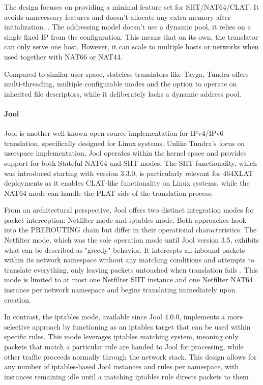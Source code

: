 The design focuses on providing a minimal feature set for SIIT/NAT64/CLAT. It avoids unnecessary features and doesn’t allocate any extra memory after initialization. \cite{labuda_tundra_nat64}. The addressing model doesn’t use a dynamic pool, it relies on a single fixed IP from the configuration. This means that on its own, the translator can only serve one host. However, it can scale to multiple hosts or networks when used together with NAT66 or NAT44\cite{labuda_tundra_nat64}.

Compared to similar user-space, stateless translators like Tayga, Tundra offers multi-threading, multiple configurable modes and the option to operate on inherited file descriptors, while it deliberately lacks a dynamic address pool\cite{labuda_tundra_nat64}. 

\paragraph{Jool} 


Jool is another well-known open-source implementation for IPv4/IPv6 translation, specifically designed for Linux systems\cite{jool_introduction}. Unlike Tundra's focus on userspace implementation, Jool operates within the kernel space and provides support for both Stateful NAT64 and SIIT modes. The SIIT functionality, which was introduced starting with version 3.3.0, is particularly relevant for 464XLAT deployments as it enables CLAT-like functionality on Linux systems, while the NAT64 mode can handle the PLAT side of the translation process\cite{jool_introduction}.

From an architectural perspective, Jool offers two distinct integration modes for packet interception: Netfilter mode and iptables mode. Both approaches hook into the PREROUTING chain but differ in their operational characteristics\cite{jool_introduction}. The Netfilter mode, which was the sole operation mode until Jool version 3.5, exhibits what can be described as "greedy" behavior. It intercepts all inbound packets within its network namespace without any matching conditions and attempts to translate everything, only leaving packets untouched when translation fails \cite{jool_introduction}. This mode is limited to at most one Netfilter SIIT instance and one Netfilter NAT64 instance per network namespace and begins translating immediately upon creation.

In contrast, the iptables mode, available since Jool 4.0.0, implements a more selective approach by functioning as an iptables target that can be used within specific rules\cite{jool_introduction}. This mode leverages iptables matching system, meaning only packets that match a particular rule are handed to Jool for processing, while other traffic proceeds normally through the network stack. This design allows for any number of iptables-based Jool instances and rules per namespace, with instances remaining idle until a matching iptables rule directs packets to them \cite{jool_introduction}.

